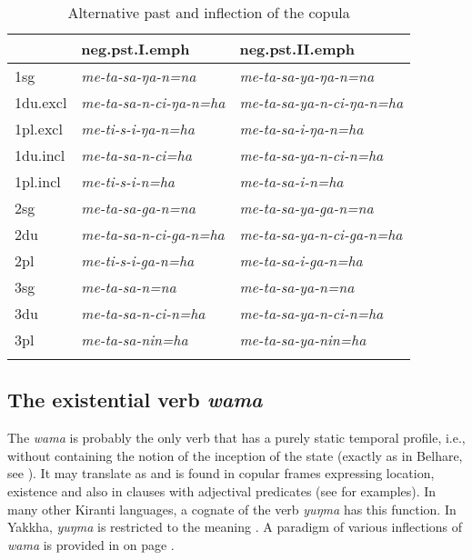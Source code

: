 \begin{table}[htp]
\begin{centering}
\begin{tabular}{lll}
\lsptoprule
  & {\sc neg.pst.I.emph}  & {\sc neg.pst.II.emph} \\
\midrule
{\sc 1sg} & \it  me-ta-sa-ŋa-n=na  & \it  me-ta-sa-ya-ŋa-n=na\\
{\sc 1du.excl} & \it  me-ta-sa-n-ci-ŋa-n=ha  & \it  me-ta-sa-ya-n-ci-ŋa-n=ha\\
{\sc 1pl.excl} & \it   me-ti-s-i-ŋa-n=ha & \it  me-ta-sa-i-ŋa-n=ha\\
{\sc 1du.incl} & \it  me-ta-sa-n-ci=ha & \it  me-ta-sa-ya-n-ci-n=ha\\
{\sc 1pl.incl} & \it  me-ti-s-i-n=ha & \it  me-ta-sa-i-n=ha\\
\midrule
{\sc 2sg} & \it  me-ta-sa-ga-n=na & \it  me-ta-sa-ya-ga-n=na\\
{\sc 2du} & \it  me-ta-sa-n-ci-ga-n=ha & \it  me-ta-sa-ya-n-ci-ga-n=ha\\
{\sc 2pl} & \it   me-ti-s-i-ga-n=ha & \it  me-ta-sa-i-ga-n=ha\\
\midrule
{\sc 3sg} & \it  me-ta-sa-n=na & \it  me-ta-sa-ya-n=na\\
{\sc 3du} & \it  me-ta-sa-n-ci-n=ha & \it  me-ta-sa-ya-n-ci-n=ha\\
{\sc 3pl} & \it  me-ta-sa-nin=ha & \it  me-ta-sa-ya-nin=ha\\
\lspbottomrule
\end{tabular}
\end{centering}
\caption{Alternative past and  inflection of the copula}\label{meti}
\end{table}



\subsection{The existential verb \emph{wama}}

The  \emph{wama}  is probably the only verb that has a purely static temporal profile, i.e., without containing the notion of the inception of the state (exactly as in Belhare, see \citealt[212]{Bickel1996Aspect}). It may translate as  and is found in copular frames expressing location, existence and also in clauses with adjectival predicates (see \Next for examples). In many other Kiranti languages, a cognate of the verb \emph{yuŋma}  has this function. In Yakkha,  \emph{yuŋma} is restricted to the meaning . A paradigm of  various  inflections of \emph{wama} is provided in  on page \pageref{par-wa-ma}.

